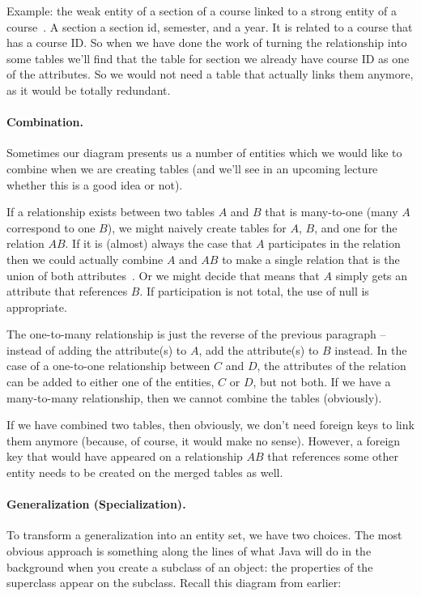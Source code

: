 Example: the weak entity of a section of a course linked to a strong entity of a course~\cite{dsc}. A section a section id, semester, and a year. It is related to a course that has a course ID. So when we have done the work of turning the relationship into some tables we'll find that the table for section we already have course ID as one of the attributes. So we would not need a table that actually links them anymore, as it would be totally redundant. 

\paragraph{Combination.}
Sometimes our diagram presents us a number of entities which we would like to combine when we are creating tables (and we'll see in an upcoming lecture whether this is a good idea or not). 

If a relationship exists between two tables $A$ and $B$ that is many-to-one (many $A$ correspond to one $B$), we might naively create tables for $A$, $B$, and one for the relation $AB$. If it is (almost) always the case that $A$ participates in the relation then we could actually combine $A$ and $AB$ to make a single relation that is the union of both attributes~\cite{dsc}. Or we might decide that means that $A$ simply gets an attribute that references $B$. If participation is not total, the use of null is appropriate.

The one-to-many relationship is just the reverse of the previous paragraph -- instead of adding the attribute(s) to $A$, add the attribute(s) to $B$ instead. In the case of a one-to-one relationship between $C$ and $D$, the attributes of the relation can be added to either one of the entities, $C$ or $D$, but not both. If we have a many-to-many relationship, then we cannot combine the tables (obviously). 

If we have combined two tables, then obviously, we don't need foreign keys to link them anymore (because, of course, it would make no sense). However, a foreign key that would have appeared on a relationship $AB$ that references some other entity needs to be created on the merged tables as well.

\paragraph{Generalization (Specialization).} To transform a generalization into an entity set, we have two choices. The most obvious approach is something along the lines of what Java will do in the background when you create a subclass of an object: the properties of the superclass appear on the subclass. Recall this diagram from earlier:


